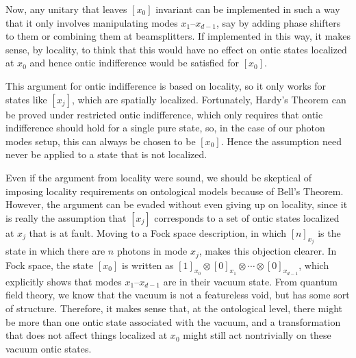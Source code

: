 \documentclass[DIV=calc,paper=a4,fontsize=11pt,twocolumn]{scrartcl} %
\theoremstyle{definition}
\theoremstyle{plain}
\newcommand{\Proj}[1]{\ensuremath{\left [ #1 \right ]}}
\begin{document}
Now, any unitary that leaves $\Proj{x_0}$ invariant can be implemented
in such a way that it only involves manipulating modes
$x_1$--$x_{d-1}$, say by adding phase shifters to them or combining
them at beamsplitters.  If implemented in this way, it makes sense, by
locality, to think that this would have no effect on ontic states
localized at $x_0$ and hence ontic indifference would be satisfied for
$\Proj{x_0}$.

This argument for ontic indifference is based on locality, so it only
works for states like $\Proj{x_j}$, which are spatially localized.
Fortunately, Hardy's Theorem can be proved under restricted ontic
indifference, which only requires that ontic indifference should hold
for a single pure state, so, in the case of our photon modes setup,
this can always be chosen to be $\Proj{x_0}$.  Hence the assumption
need never be applied to a state that is not localized.

Even if the argument from locality were sound, we should be skeptical
of imposing locality requirements on ontological models because of
Bell's Theorem.  However, the argument can be evaded without even
giving up on locality, since it is really the assumption that
$\Proj{x_j}$ corresponds to a set of ontic states localized at $x_j$
that is at fault.  Moving to a Fock space description, in which
$\Proj{n}_{x_j}$ is the state in which there are $n$ photons in mode
$x_j$, makes this objection clearer.  In Fock space, the state
$\Proj{x_0}$ is written as $\Proj{1}_{x_0} \otimes \Proj{0}_{x_1}
\otimes \cdots \otimes \Proj{0}_{x_{d-1}}$, which explicitly shows that
modes $x_1$--$x_{d-1}$ are in their vacuum state.  From quantum field
theory, we know that the vacuum is not a featureless void, but has
some sort of structure.  Therefore, it makes sense that, at the
ontological level, there might be more than one ontic state associated
with the vacuum, and a transformation that does not affect things
localized at $x_0$ might still act nontrivially on these vacuum ontic
states.
\end{document}

